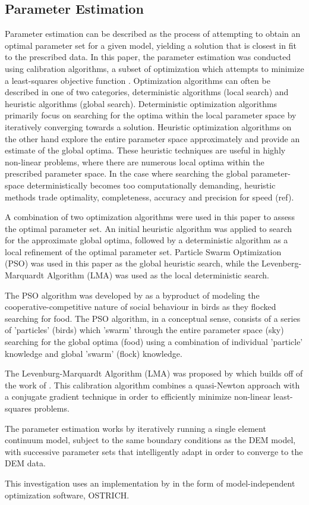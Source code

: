 \subsection{Parameter Estimation}
Parameter estimation can be described as the process of attempting to obtain an optimal parameter set for a given model, yielding a solution that is closest in fit to the prescribed data. In this paper, the parameter estimation was conducted using calibration algorithms, a subset of optimization which attempts to minimize a least-squares objective function \cite{matott_ostrich:_2008}. Optimization algorithms can often be described in one of two categories, deterministic algorithms (local search) and heuristic algorithms (global search). Deterministic optimization algorithms primarily focus on searching for the optima within the local parameter space by iteratively converging towards a solution. Heuristic optimization algorithms on the other hand explore the entire parameter space approximately and provide an estimate of the global optima. These heuristic techniques are useful in highly non-linear problems, where there are numerous local optima within the prescribed parameter space. In the case where searching the global parameter-space deterministically becomes too computationally demanding, heuristic methods trade optimality, completeness, accuracy and precision for speed (ref). 

A combination of two optimization algorithms were used in this paper to assess the optimal parameter set. An initial heuristic algorithm was applied to search for the approximate global optima, followed by a deterministic algorithm as a local refinement of the optimal parameter set. Particle Swarm Optimization (PSO) was used in this paper as the global heuristic search, while the Levenberg-Marquardt Algorithm (LMA) was used as the local deterministic search. 

The PSO algorithm was developed by \citet{Kennedy} as a byproduct of modeling the cooperative-competitive nature of social behaviour in birds as they flocked searching for food. The PSO algorithm, in a conceptual sense, consists of a series of 'particles' (birds) which 'swarm' through the entire parameter space (sky) searching for the global optima (food) using a combination of individual 'particle' knowledge and global 'swarm' (flock) knowledge.

The Levenburg-Marquardt Algorithm (LMA) was proposed by \citet{marquardt_algorithm_1963} which builds off of the work of \citet{levenberg_method_1944}. This calibration algorithm combines a quasi-Newton approach with a conjugate gradient technique in order to efficiently minimize non-linear least-squares problems. 

The parameter estimation works by iteratively running a single element continuum model, subject to the same boundary conditions as the DEM model, with successive parameter sets that intelligently adapt in order to converge to the DEM data. 

This investigation uses an implementation by \citet{matott_ostrich:_2008} in the form of model-independent optimization software, OSTRICH.

